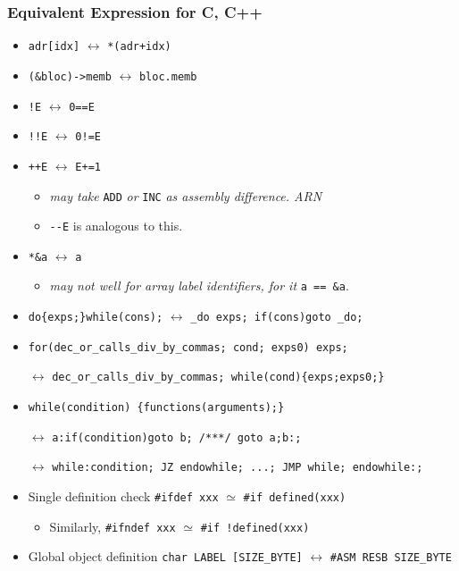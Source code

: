 
\subsubsection{Equivalent Expression for C, C++}

\begin{itemize}
	\item{\verb|adr[idx]| $\leftrightarrow$ \verb|*(adr+idx)|}
	\item{\verb|(&bloc)->memb| $\leftrightarrow$ \verb|bloc.memb|}
	\item{\verb|!E| $\leftrightarrow$ \verb|0==E|}
	\item{\verb|!!E| $\leftrightarrow$ \verb|0!=E|}
	\item{\verb|++E| $\leftrightarrow$ \verb|E+=1|
		\begin{itemize}
			\item\textit{may take} \verb|ADD| \textit{or} \verb|INC| \textit{as assembly difference. \textemdash ARN}
			\item\verb|--E| is analogous to this.
		\end{itemize}
	}
	\item{\verb|*&a| $\leftrightarrow$ \verb|a|
		\begin{itemize}
			\item\textit{may not well for array label identifiers, for it} \verb|a == &a|.
		\end{itemize}
	}
	\item{\verb|do{exps;}while(cons);| $\leftrightarrow$ \verb|_do exps; if(cons)goto _do;|}
	\item{\verb|for(dec_or_calls_div_by_commas; cond; exps0) exps;| 
		
		$\leftrightarrow$ \verb|dec_or_calls_div_by_commas; while(cond){exps;exps0;}|}
	\item{\verb|while(condition) {functions(arguments);}| 
		
		$\leftrightarrow$ \verb|a:if(condition)goto b; /***/ goto a;b:;| 
		
		$\leftrightarrow$ \verb|while:condition; JZ endowhile; ...; JMP while; endowhile:;|}
	\item{Single definition check \verb|#ifdef xxx| $\simeq$ \verb|#if defined(xxx)|
		\begin{itemize}\item Similarly, \verb|#ifndef xxx| $\simeq$ \verb|#if !defined(xxx)|\end{itemize}
	}
	
	\item{Global object definition \verb|char LABEL [SIZE_BYTE]| $\leftrightarrow$ \verb|#ASM RESB SIZE_BYTE|}
	

\end{itemize}
